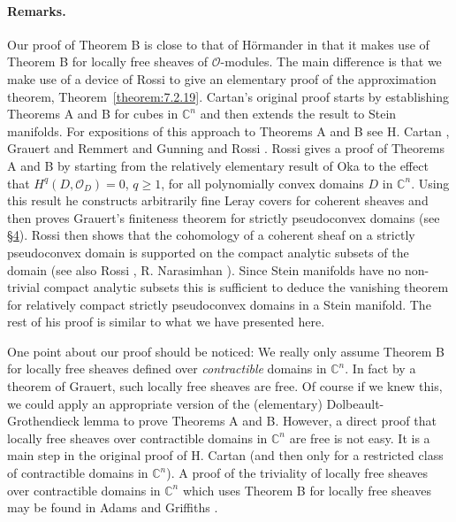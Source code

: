 \paragraph{Remarks.} Our proof of Theorem B is close to that of H\"ormander \cite{bib:II:hormander-l:1} in that it makes use of Theorem B for locally free sheaves of $\mathcal O$-modules. The main difference is that we make use of a
 device of Rossi \cite{bib:II:rossi-h:1} to give an elementary proof of the approximation theorem, Theorem~\ref{theorem:7.2.19}. Cartan's original proof starts by establishing Theorems A and B for cubes in $\mathbb C^n$ and then extends the result to Stein manifolds. For expositions of this approach to Theorems A and B see H. Cartan \cite{bib:II:cartan-h:1}, Grauert and Remmert \cite{bib:II:grauert-h-and-remmert-r:1} and Gunning and Rossi \cite{bib:II:gunning-r-c-and-rossi-h:1}. Rossi \cite{bib:II:rossi-h:1} gives a proof of Theorems A and B by starting from the relatively elementary result of Oka to the effect that $H^q(D,\mathcal O_D)=0$, $q\geq1$, for all polynomially convex domains $D$ in $\mathbb C^n$. Using this result he constructs arbitrarily fine Leray covers for coherent sheaves and then proves Grauert's finiteness theorem for strictly pseudoconvex domains (see \hyperref[sec:7:4]{\S4}). Rossi then shows that the cohomology of a coherent sheaf on a strictly pseudoconvex domain is supported on the compact analytic subsets of the domain (see also Rossi \cite{bib:II:rossi-h:2}, R. Narasimhan \cite{bib:II:narasimhan-r:3}). Since Stein manifolds have no non-trivial compact analytic subsets this is sufficient to deduce the vanishing theorem for relatively compact strictly pseudoconvex domains in a Stein manifold. The rest of his proof is similar to what we have presented here.

One point about our proof should be noticed: We really only assume Theorem B for locally free sheaves defined over \emph{contractible} domains in $\mathbb C^n$. In fact by a theorem of Grauert, such locally free sheaves are free. Of course if we knew this, we could apply an appropriate version of the (elementary) Dolbeault-Grothendieck lemma to prove Theorems A and B. However, a direct proof that locally free sheaves over contractible domains in $\mathbb C^n$ are free is not easy. It is a main step in the original proof of H. Cartan (and then only for a restricted class of contractible domains in $\mathbb C^n$). A proof of the triviality of locally free sheaves over contractible domains in $\mathbb C^n$ which uses Theorem B for locally free sheaves may be found in Adams and Griffiths \cite{bib:II:adams-j-f-and-griffiths-p:1}.

